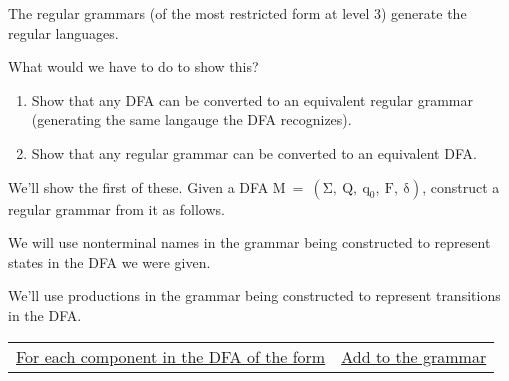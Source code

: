 \documentclass[12pt]{article}
\begin{document}
      The regular grammars (of the most restricted form at level 3) generate
      the regular languages.

      What would we have to do to show this?

      \vspace{-1mm}

      \begin{enumerate}

        \addtolength{\itemsep}{-1mm}

        \item Show that any DFA can be converted to an equivalent regular
              grammar (generating the same langauge the DFA recognizes).

        \item Show that any regular grammar can be converted to an
              equivalent DFA.

      \end{enumerate}

      \vspace{-1mm}

      We'll show the first of these.  Given a DFA
      \(
        \mathrm{
          M \: = \: ( \Sigma, \: Q, \: {q_0}, \: F, \: \delta )
        }
      \),
      construct a regular grammar from it as follows.

      We will use nonterminal names in the grammar being constructed to
      represent states in the DFA we were given.

      We'll use productions in the grammar being constructed to represent
      transitions in the DFA.

      \pagebreak

      \begin{list}{}{}

        \item

          \begin{tabular}[t]{@{}p{3.8in}p{2.55in}@{}}

            \underline{For each component in the DFA of the form}
              & \underline{Add to the grammar}
              \\

          \end{tabular}

      \end{list}

      \medskip

      \enlargethispage{2mm}
\end{document}
